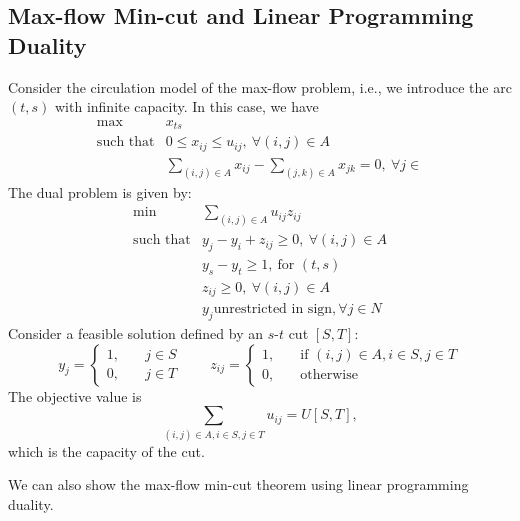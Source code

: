 \subsection{Max-flow Min-cut and Linear Programming Duality}
Consider the circulation model of the max-flow problem, i.e., we introduce the arc $(t,s)$ with infinite capacity.
In this case, we have
\[
\begin{array}{ll}
\max&x_{ts}\\
\mbox{such that}&0\le x_{ij}\le u_{ij},\ \forall(i,j)\in A\\
&\sum_{(i,j)\in A}x_{ij} - \sum_{(j,k)\in A}x_{jk}=0,\ \forall j\in 
\end{array}
\]
The dual problem is given by:
\[
\begin{array}{ll}
\min&\sum_{(i,j)\in A}u_{ij}z_{ij}\\
\mbox{such that}&y_j - y_i + z_{ij}\ge0,\ \forall(i,j)\in A\\
&y_s - y_t\ge1,\ \text{for $(t,s)$}\\
&z_{ij}\ge0, \ \forall(i,j)\in A\\
& y_j\text{unrestricted in sign}, \forall j\in N
\end{array}
\]
Consider a feasible solution defined by an $s$-$t$ cut $[S,T]$:
\[
y_j=\left\{
\begin{aligned}
1,&\quad j\in S\\
0,&\quad j\in T
\end{aligned}
\right.
\qquad
z_{ij}=\left\{
\begin{aligned}
1,&\quad\text{if $(i,j)\in A,i\in S,j\in T$}\\
0,&\quad\text{otherwise}
\end{aligned}
\right.
\]
The objective value is 
\[
\sum_{(i,j)\in A, i\in S,j\in T}u_{ij}=U[S,T],
\]
which is the capacity of the cut.


We can also show the max-flow min-cut theorem using linear programming duality.















